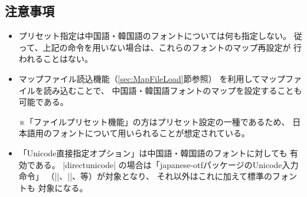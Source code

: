 \documentclass[uplatex,dvipdfmx,a4paper]{jsarticle}
\newcommand{\Pkg}[1]{\textsf{#1}}
\newcommand{\Note}{\par\noindent ※}
\begin{document}
\subsection{注意事項}

\begin{itemize}
\item プリセット指定は中国語・韓国語のフォントについては何も指定しない。
従って、上記の命令を用いない場合は、これらのフォントのマップ再設定が
行われることはない。
\item マップファイル読込機能（\ref{sec:MapFileLoad}節参照）
を利用してマップファイルを読み込むことで、
中国語・韓国語フォントのマップを設定することも可能である。
\Note 「ファイルプリセット機能」の方はプリセット設定の一種であるため、
日本語用のフォントについて用いられることが想定されている。
\item 「Unicode直接指定オプション」は中国語・韓国語のフォントに対しても
有効である。
|directunicode| の場合は「\Pkg{japanese-otf}パッケージのUnicode入力命令」
（|\UTFK|、|\UTFM|、等）が対象となり、
それ以外はこれに加えて{\upTeX}標準のフォントも
対象になる。
\end{itemize}

\end{document}
